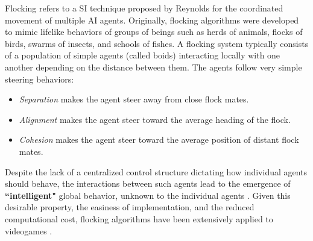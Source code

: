 \documentclass[journal]{IEEEtran}
\begin{document}
Flocking refers to a SI technique proposed by Reynolds \cite{Reynolds87} for the coordinated movement of multiple AI agents. Originally, flocking algorithms were developed to mimic lifelike behaviors of groups of beings such as herds of animals, flocks of birds, swarms of insects, and schools of fishes. A flocking system typically consists of a population of simple agents (called boids) interacting locally with one another depending on the distance between them. The agents follow very simple steering behaviors:

\begin{itemize}
	\item \textit{Separation} makes the agent steer away from close flock mates.
	\item \textit{Alignment} makes the agent steer toward the average heading of the flock.
	\item \textit{Cohesion} makes the agent steer toward the average position of distant flock mates.
\end{itemize} 

Despite the lack of a centralized control structure dictating how
individual agents should behave, the interactions between such agents
lead to the emergence of  \textbf{``intelligent"} global behavior, unknown to the
individual agents \cite{SpectorEtAl03}. Given this desirable property,
the easiness of implementation, and the reduced computational cost,
flocking algorithms have been extensively applied to videogames
\cite{Scutt02}.
\end{document}
